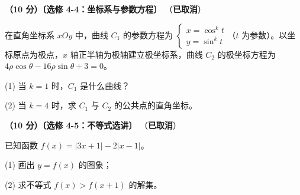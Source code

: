 \begin{question}
\textbf{（10 分）〔选修 4-4：坐标系与参数方程〕} （\textbf{已取消}）

在直角坐标系 $xOy$ 中，曲线 $C_1$ 的参数方程为 $\begin{cases}x=\cos^{k}t\\ y=\sin^{k}t\end{cases}$（$t$ 为参数）。以坐标原点为极点，$x$ 轴正半轴为极轴建立极坐标系，曲线 $C_2$ 的极坐标方程为 $4\rho\cos\theta-16\rho\sin\theta+3=0$。

  (1) 当 $k=1$ 时，$C_1$ 是什么曲线？

  (2) 当 $k=4$ 时，求 $C_1$ 与 $C_2$ 的公共点的直角坐标。

\end{question}
\begin{question}
\textbf{（10 分）〔选修 4-5：不等式选讲〕} （\textbf{已取消}）

已知函数 $f(x)=|3x+1|-2|x-1|$。

  (1) 画出 $y=f(x)$ 的图象；

  (2) 求不等式 $f(x)>f(x+1)$ 的解集。

\par\medskip


\end{question}